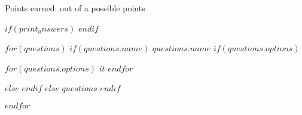 \documentclass{exam}
\begin{document}
\pagestyle{headandfoot}
\firstpagefooter{}{}{}
\runningfooter{}
{}
{Points earned: \makebox[1in]{\hrulefill}
out of a possible \pointsonpage{\thepage} points}
\runningfootrule

\begin{center}
\end{center}

\vspace{0.1in}

$if(print_answers)$
\printanswers
$endif$
\vspace{0.2in}

\begin{questions}
$for(questions)$
    $if(questions.name)$
        \question[1] $questions.name$
        $if(questions.options)$
            \begin{checkboxes}
            $for(questions.options)$
                {\CorrectChoice {}}
                {\choice $it$}
            $endfor$
            \end{checkboxes}
        $else$
        \vspace{1in}
        $endif$
        $else$
        $questions$
    $endif$

$endfor$

\end{questions}
\end{document}
